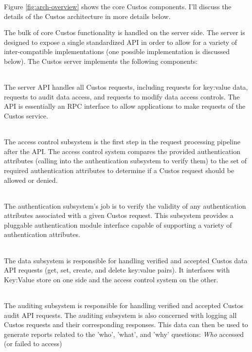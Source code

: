 Figure \ref{fig:arch-overview} shows the core Custos components. I'll
discuss the details of the Custos architecture in more details below.

The bulk of core Custos functionality is handled on the server
side. The server is designed to expose a single standardized API in
order to allow for a variety of inter-compatible implementations (one
possible implementation is discussed below). The Custos server
implements the following components:

\begin{packed_desc}
\item[API] \hfill \\ The server API handles all Custos requests,
  including requests for key:value data, requests to audit data
  access, and requests to modify data access controls. The API is
  essentially an RPC interface to allow applications to make requests
  of the Custos service.
\item[Access Control Subsystem] \hfill \\ The access control subsystem
  is the first step in the request processing pipeline after the
  API. The access control system compares the provided authentication
  attributes (calling into the authentication subsystem to verify
  them) to the set of required authentication attributes to determine
  if a Custos request should be allowed or denied.
\item[Authentication Subsystem] \hfill \\ The authentication
  subsystem's job is to verify the validity of any authentication
  attributes associated with a given Custos request. This subsystem
  provides a pluggable authentication module interface capable of
  supporting a variety of authentication attributes.
\item[Data Subsystem] \hfill \\ The data subsystem is responsible for
  handling verified and accepted Custos data API requests (get, set,
  create, and delete key:value pairs). It interfaces with Key:Value
  store on one side and the access control system on the other.
\item[Auditing Subsystem] \hfill \\ The auditing subsystem is
  responsible for handling verified and accepted Custos audit API
  requests. The auditing subsystem is also concerned with logging all
  Custos requests and their corresponding responses. This data can
  then be used to generate reports related to the 'who', 'what', and
  'why' questions: \emph{Who} accessed (or failed to access)

\end{packed_desc}
